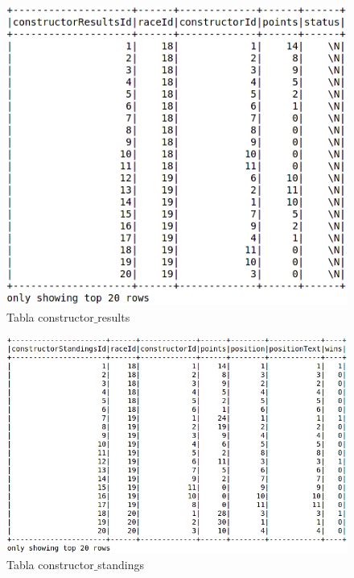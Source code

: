 \documentclass[12pt,twoside,titlepage]{report}
\begin{document}
\begin{figure}
  \includegraphics[scale=0.4]{constructor_results_table.png}
  \centering
  \caption{Tabla constructor$\_$results}
  \label{fig:constructorres}
  \centering
\end{figure}

\begin{figure}
  \includegraphics[scale=0.4]{constructor_standings_table.png}
  \centering
  \caption{Tabla constructor$\_$standings}
  \label{fig:constructorstands}
  \centering
\end{figure}
\end{document}
